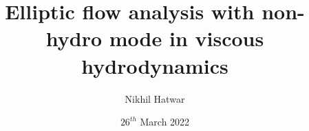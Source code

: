 \documentclass[aspectratio=1610]{beamer}
\title[Research Scholar Day]{Elliptic flow analysis with non-hydro mode in viscous hydrodynamics } %
\author{ Nikhil Hatwar } %
\institute[] %
{
 Supervisor : Prof. Madhukar Mishra\\~\\
 DAC Members : Prof. Tapomoy Guha Sarkar and Prof. Navin Singh\\

\medskip
{\large Physics Department, Birla Institute of Technology and Science, Pilani } \\ %
\medskip
{\LARGE Research Scholar Day}\\
}
\date{$26^{th}$ March 2022}
\begin{document}
\begin{frame}
\titlepage %
\end{frame}











\end{document}
